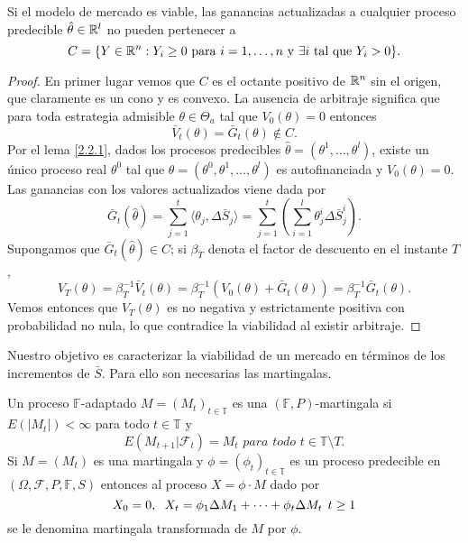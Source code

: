 \bigskip
\begin{lemaBox}\label{3.2.1}
	Si el modelo de mercado es viable, las ganancias actualizadas a cualquier proceso predecible $ \hat{\theta} \in \mathbb{R} ^l $ no pueden pertenecer a 
	\[
	C = \{Y \in \mathbb{R}^n: Y_i \geq 0\text{ para } i=1,\dots,n \text{ y } \exists i \text{ tal que } Y_i > 0\}.
	\]
\end{lemaBox}
\begin{proof}
	En primer lugar vemos que $ C $ es el octante positivo de $ \mathbb{R}^n $ sin el origen, que claramente es un cono y es convexo. La ausencia de arbitraje significa que para toda estrategia admisible $ \theta \in \Theta_a $ tal que $ V_0(\theta) = 0 $ entonces
	\[
	\bar{V}_t(\theta) = \bar{G}_t (\theta) \notin C.
	\]
	Por el lema \ref{2.2.1}, dados los procesos predecibles $ \hat{\theta} = (\theta^1, \dots,\theta^l) $, existe un único proceso real $ \theta^0 $ tal que $ \theta = (\theta^0, \theta^1,\dots, \theta^l) $ es autofinanciada y $ V_0(\theta) = 0 $. Las ganancias con los valores actualizados viene dada por
	\[
	\bar{G}_t(\hat{\theta}) = \sum_{j=1}^{t} \langle \theta_j, \Delta \bar{S}_j \rangle =   \sum_{j=1}^{t} \left( \sum_{i=1}^{l} \theta_j^i \Delta \bar{S}_j^i  \right).
	\]
	Supongamos que $ \bar{G}_t(\hat{\theta}) \in C $; si $ \beta_T $ denota el factor de descuento en el instante $ T $,
	\[
	V_T(\theta) = \beta_T^{-1} \bar{V}_t(\theta) = \beta_T^{-1}(V_0 (\theta) + \bar{G}_t(\theta)) = \beta_T^{-1}\bar{G}_t(\theta).
	\]
	Vemos entonces que $ V_T(\theta) $ es no negativa y estrictamente positiva con probabilidad no nula, lo que contradice la viabilidad al existir arbitraje.
\end{proof}
\bigskip
Nuestro objetivo es caracterizar la viabilidad de un mercado en términos de los incrementos de $ \bar{S} $. Para ello son necesarias las martingalas.
\bigskip
\begin{definicion}
	Un proceso $ \mathbb{F} $-adaptado $ M = (M_t)_{t\in \mathbb{T}} $ es una $ ( \mathbb{F},P)$-mar\-tingala si $ E(|M_t|) < \infty $ para todo $ t \in \mathbb{T} $ y 
	\[
	E(M_{t+1}|\mathcal{F}_t) = M_t \textit{ para todo } t \in \mathbb{T}\setminus{T}.
	\]
	Si $ M = (M_t) $ es una martingala y $ \phi = (\phi_t)_{t\in \mathbb{T}} $ es un proceso predecible en $ (\Omega, \mathcal{F}, P, \mathbb{F}, S) $ entonces al proceso $ X = \phi \cdot M $ dado por
	\[
	X_0=0, \hspace{2mm}X_t = \phi_1\Delta M_1+\cdots+ \phi_t\Delta M_t \hspace{1.5mm} t \geq1
	\]
	se le denomina martingala transformada de $ M $ por $ \phi $.
\end{definicion}

